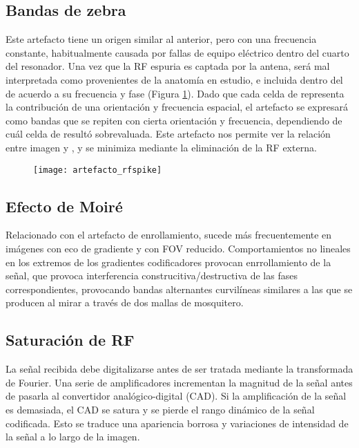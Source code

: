 \subsection{Bandas de zebra}
Este artefacto tiene un origen similar al anterior, pero con una frecuencia constante, habitualmente causada por fallas de equipo eléctrico dentro del cuarto del resonador. Una vez que la RF espuria es captada por la antena, será mal interpretada como provenientes de la anatomía en estudio, e incluida dentro del \espaciok de acuerdo a su frecuencia y fase (Figura \ref{fig:artefacto_rfspike}).  Dado que cada celda de \espaciok representa la contribución de una orientación y frecuencia espacial, el artefacto se expresará como bandas que se repiten con cierta orientación y frecuencia, dependiendo de cuál celda de \espaciok resultó sobrevaluada. Este artefacto nos permite ver la relación entre imagen y \espaciok, y se minimiza mediante la eliminación de la RF externa.

\begin{figure}[htb]
 \begin{figg}
   \texttt{[image: artefacto\_rfspike]}
   \caption{\figurapendiente}
 \label{fig:artefacto_rfspike}
 \end{figg}
\end{figure}
 



\subsection{Efecto de Moiré}
Relacionado con el artefacto de enrollamiento, sucede más frecuentemente en imágenes con eco de gradiente y con FOV reducido. Comportamientos no lineales en los extremos de los gradientes codificadores provocan enrrollamiento de la señal, que provoca interferencia construcitiva/destructiva de las fases correspondientes, provocando bandas alternantes curvilíneas similares a las que se producen al mirar a través de dos mallas de mosquitero. 

\subsection{Saturación de RF}
La señal recibida debe digitalizarse antes de ser tratada mediante la transformada de Fourier. Una serie de amplificadores incrementan la magnitud de la señal antes de pasarla al convertidor analógico-digital (CAD). Si la amplificación de la señal es demasiada, el CAD se satura y se pierde el rango dinámico de la señal codificada. Esto se traduce una apariencia borrosa y variaciones de intensidad de la señal a lo largo de la imagen.

